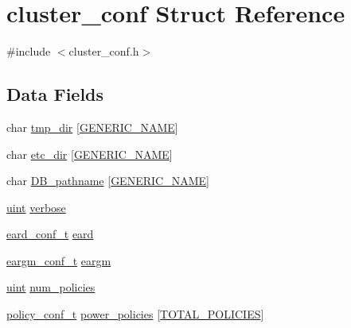 \hypertarget{structcluster__conf}{}\section{cluster\+\_\+conf Struct Reference}
\label{structcluster__conf}


{\ttfamily \#include $<$cluster\+\_\+conf.\+h$>$}

\subsection*{Data Fields}
\begin{DoxyCompactItemize}
\item 
char \hyperlink{structcluster__conf_a40575ca0a8531ed7a98c356616c27fb7}{tmp\+\_\+dir} \mbox{[}\hyperlink{loop_8h_a6b0b8b14cfc75447be8feba3efe18da8}{G\+E\+N\+E\+R\+I\+C\+\_\+\+N\+A\+ME}\mbox{]}
\item 
char \hyperlink{structcluster__conf_a2bdb2d85ee75717f81cd78e70eff5e79}{etc\+\_\+dir} \mbox{[}\hyperlink{loop_8h_a6b0b8b14cfc75447be8feba3efe18da8}{G\+E\+N\+E\+R\+I\+C\+\_\+\+N\+A\+ME}\mbox{]}
\item 
char \hyperlink{structcluster__conf_a8ea0321232d44d691e73ce38d5bc0fb8}{D\+B\+\_\+pathname} \mbox{[}\hyperlink{loop_8h_a6b0b8b14cfc75447be8feba3efe18da8}{G\+E\+N\+E\+R\+I\+C\+\_\+\+N\+A\+ME}\mbox{]}
\item 
\hyperlink{generic_8h_a91ad9478d81a7aaf2593e8d9c3d06a14}{uint} \hyperlink{structcluster__conf_a5262e1ff09faa8c205475875d07a3f34}{verbose}
\item 
\hyperlink{cluster__conf_8h_ab58e601c68bae45a48eb70dc9dfe7d09}{eard\+\_\+conf\+\_\+t} \hyperlink{structcluster__conf_affd58ce65e7c6a7af4a0092b51b787df}{eard}
\item 
\hyperlink{cluster__conf_8h_a75027be4ac348fc2af4a15e0429b469c}{eargm\+\_\+conf\+\_\+t} \hyperlink{structcluster__conf_a6d19f089e9980b53296e2a4366895442}{eargm}
\item 
\hyperlink{generic_8h_a91ad9478d81a7aaf2593e8d9c3d06a14}{uint} \hyperlink{structcluster__conf_a5acb9a03e4e53adcf5d55fe6d0b1dcb5}{num\+\_\+policies}
\item 
\hyperlink{cluster__conf_8h_adb213a7b2565c7dc2cc3c9305f0cbc8d}{policy\+\_\+conf\+\_\+t} \hyperlink{structcluster__conf_a1123ed63aa74af2add68d21624c248d0}{power\+\_\+policies} \mbox{[}\hyperlink{policy__conf_8h_ad9b630150b093b5fcde3c230c2820465}{T\+O\+T\+A\+L\+\_\+\+P\+O\+L\+I\+C\+I\+ES}\mbox{]}
\item 

\end{DoxyCompactItemize}
